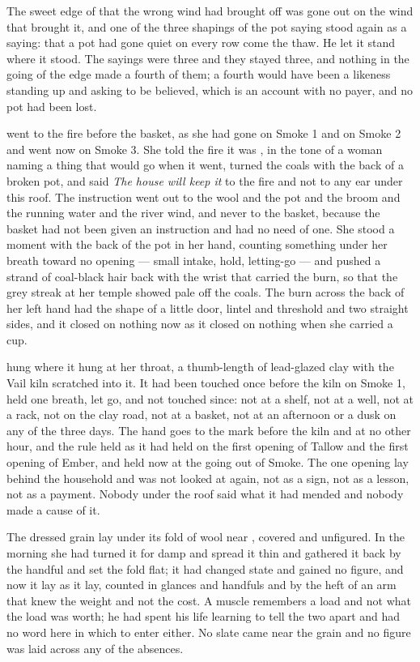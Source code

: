 The sweet edge of  that the wrong wind had brought off  was gone out on the wind that brought it, and one of the three shapings of the pot saying stood again as a saying: that a pot had gone quiet on every row come the thaw. He let it stand where it stood. The sayings were three and they stayed three, and nothing in the going of the edge made a fourth of them; a fourth would have been a likeness standing up and asking to be believed, which is an account with no payer, and no pot had been lost.

 went to the fire before the basket, as she had gone on Smoke 1 and on Smoke 2 and went now on Smoke 3. She told the fire it was , in the tone of a woman naming a thing that would go when it went, turned the coals with the back of a broken pot, and said \emph{The house will keep it} to the fire and not to any ear under this roof. The instruction went out to the wool and the pot and the broom and the running water and the river wind, and never to the basket, because the basket had not been given an instruction and had no need of one. She stood a moment with the back of the pot in her hand, counting something under her breath toward no opening --- small intake, hold, letting-go --- and pushed a strand of coal-black hair back with the wrist that carried the burn, so that the grey streak at her temple showed pale off the coals. The burn across the back of her left hand had the shape of a little door, lintel and threshold and two straight sides, and it closed on nothing now as it closed on nothing when she carried a cup.

 hung where it hung at her throat, a thumb-length of lead-glazed clay with the Vail kiln scratched into it. It had been touched once before the kiln on Smoke 1, held one breath, let go, and not touched since: not at a shelf, not at a well, not at a rack, not on the clay road, not at a basket, not at an afternoon or a dusk on any of the three days. The hand goes to the mark before the kiln and at no other hour, and the rule held as it had held on the first opening of Tallow and the first opening of Ember, and held now at the going out of Smoke. The one opening lay behind the household and was not looked at again, not as a sign, not as a lesson, not as a payment. Nobody under the roof said what it had mended and nobody made a cause of it.

The dressed grain lay under its fold of wool near , covered and unfigured. In the morning she had turned it for damp and spread it thin and gathered it back by the handful and set the fold flat; it had changed state and gained no figure, and now it lay as it lay, counted in glances and handfuls and by the heft of an arm that knew the weight and not the cost. A muscle remembers a load and not what the load was worth; he had spent his life learning to tell the two apart and had no word here in which to enter either. No slate came near the grain and no figure was laid across any of the absences.

